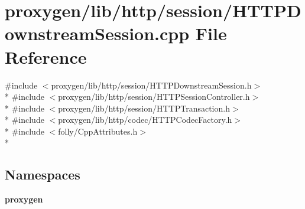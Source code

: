 \section{proxygen/lib/http/session/\+H\+T\+T\+P\+Downstream\+Session.cpp File Reference}
\label{HTTPDownstreamSession_8cpp}
{\ttfamily \#include $<$proxygen/lib/http/session/\+H\+T\+T\+P\+Downstream\+Session.\+h$>$}\\*
{\ttfamily \#include $<$proxygen/lib/http/session/\+H\+T\+T\+P\+Session\+Controller.\+h$>$}\\*
{\ttfamily \#include $<$proxygen/lib/http/session/\+H\+T\+T\+P\+Transaction.\+h$>$}\\*
{\ttfamily \#include $<$proxygen/lib/http/codec/\+H\+T\+T\+P\+Codec\+Factory.\+h$>$}\\*
{\ttfamily \#include $<$folly/\+Cpp\+Attributes.\+h$>$}\\*
\subsection*{Namespaces}
\begin{DoxyCompactItemize}
\item 
 {\bf proxygen}
\end{DoxyCompactItemize}
